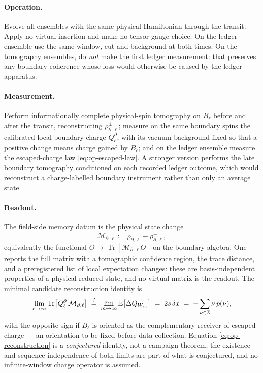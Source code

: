 \paragraph{Operation.} Evolve all ensembles with the same physical Hamiltonian
through the transit. Apply no virtual insertion and make no tensor-gauge
choice. On the ledger ensemble use the same window, cut and background at both
times. On the tomography ensembles, do \emph{not} make the first ledger
measurement: that preserves any boundary coherence whose loss would otherwise
be caused by the ledger apparatus.

\paragraph{Measurement.} Perform informationally complete physical-spin
tomography on $B_\ell$ before and after the transit, reconstructing
$\rho^{\pm}_{\partial,\ell}$; measure on the same boundary spins the calibrated
local boundary charge $Q^{\partial}_\ell$, with its vacuum background fixed so
that a positive change means charge gained by $B_\ell$; and on the ledger
ensemble measure the escaped-charge law \eqref{eq:op-escaped-law}. A stronger
version performs the late boundary tomography conditioned on each recorded
ledger outcome, which would reconstruct a charge-labelled boundary instrument
rather than only an average state.

\paragraph{Readout.} The field-side memory datum is the physical state change
\begin{equation}
  \mathcal{M}_{\partial,\ell}
  :=\rho^{+}_{\partial,\ell}-\rho^{-}_{\partial,\ell},
  \label{eq:op-boundary-memory}
\end{equation}
equivalently the functional
$O\mapsto\operatorname{Tr}[\mathcal{M}_{\partial,\ell}O]$ on the boundary
algebra. One reports the full matrix with a tomographic confidence region, the
trace distance, and a preregistered list of local expectation changes: these
are basis-independent properties of a physical reduced state, and no virtual
matrix is the readout. The minimal candidate reconstruction identity is
\begin{equation}
  \lim_{\ell\to\infty}
    \operatorname{Tr}\bigl[Q^{\partial}_\ell\,\mathcal{M}_{\partial,\ell}\bigr]
  \;\overset{?}{=}\;
  \lim_{m\to\infty}\mathbb{E}\bigl[\Delta Q_{W_m}\bigr]
  \;=\;2s\,\delta x
  \;=\;-\sum_{\nu\in\mathbb{Z}}\nu\,p(\nu),
  \label{eq:op-reconstruction}
\end{equation}
with the opposite sign if $B_\ell$ is oriented as the complementary receiver of
escaped charge --- an orientation to be fixed before data collection. Equation
\eqref{eq:op-reconstruction} is a \emph{conjectured} identity, not a campaign
theorem; the existence and sequence-independence of both limits are part of
what is conjectured, and no infinite-window charge operator is assumed.

